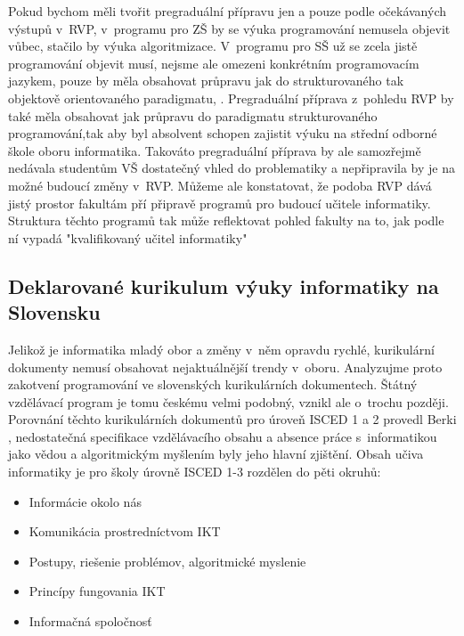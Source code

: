 \documentclass[FP,DP]{tulthesis}
\begin{document}
{{Pokud bychom měli tvořit pregraduální přípravu jen a pouze podle  očekávaných výstupů v~RVP, v~programu pro ZŠ by se výuka programování  nemusela objevit vůbec, stačilo by výuka algoritmizace. V~programu pro SŠ už se zcela jistě programování objevit musí, nejsme ale omezeni konkrétním programovacím jazykem, pouze by měla obsahovat průpravu jak do strukturovaného tak objektově orientovaného paradigmatu, . Pregraduální příprava z~pohledu RVP by také měla obsahovat jak průpravu do paradigmatu strukturovaného programování,tak aby byl absolvent schopen zajistit výuku na střední odborné škole oboru informatika. Takováto pregraduální příprava by ale samozřejmě nedávala studentům VŠ dostatečný vhled do problematiky a nepřipravila by je na možné budoucí změny v~RVP. Můžeme ale konstatovat, že podoba RVP dává jistý prostor fakultám pří připravě programů pro budoucí učitele informatiky. Struktura těchto programů tak může reflektovat pohled fakulty na to, jak podle ní vypadá "kvalifikovaný učitel informatiky" 
\subsection{Deklarované kurikulum výuky informatiky na Slovensku}
Jelikož je informatika mladý obor a změny v~něm opravdu rychlé, kurikulární dokumenty nemusí obsahovat nejaktuálnější trendy v~oboru. Analyzujme  proto zakotvení programování ve slovenských kurikulárních dokumentech. Štátný vzdělávací program je tomu českému velmi podobný, vznikl ale o~trochu později. Porovnání těchto kurikulárních dokumentů  pro úroveň ISCED 1 a 2 provedl Berki \citeyearpar{berki2011}, nedostatečná specifikace vzdělávacího obsahu a absence práce s~informatikou jako vědou a algoritmickým myšlením byly jeho  hlavní zjištění. \citep[s.~36]{berki2011} Obsah učiva informatiky je pro školy úrovně ISCED 1-3 rozdělen do pěti okruhů:
\begin{itemize}
\setlength\itemsep{0.01em}
  	\item Informácie okolo nás
	\item Komunikácia prostredníctvom IKT
  	\item Postupy, riešenie problémov, algoritmické myslenie
	\item Princípy fungovania IKT
	\item Informačná spoločnosť
\end{itemize}

}}
\end{document}
